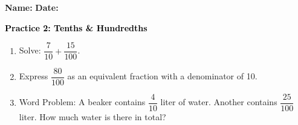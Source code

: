 \documentclass[12pt, letterpaper, fleqn]{article}
\begin{document}
\textbf{Name:} \underline{\hspace{5cm}}
\hfill
\textbf{Date:} \underline{\hspace{3cm}}\\

\begin{tcolorbox}[colback=customteal!20]
    \large\textcolor{black}{\textbf{Practice 2: Tenths & Hundredths}}
\end{tcolorbox}
\begin{enumerate}[itemsep=3.5cm, leftmargin=0.6cm]
\item Solve: $\dfrac{7}{10} + \dfrac{15}{100}$.
\vspace{3.5cm}
\item Express $\dfrac{80}{100}$ as an equivalent fraction with a denominator of 10.
\vspace{3.5cm}
\item Word Problem: A beaker contains $\dfrac{4}{10}$ liter of water. Another contains $\dfrac{25}{100}$ liter. How much water is there in total?
\end{enumerate}
\end{document}
